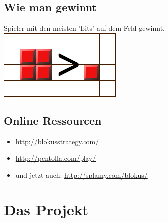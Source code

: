 \documentclass[12pt, draft]{beamer}
\begin{document}
\subsection{Wie man gewinnt}
\begin{frame}
	Spieler mit den meisten 'Bits' auf dem Feld gewinnt.
	\includegraphics[width=0.7\linewidth]{media/how2play6.png}
\end{frame}

\subsection{Online Ressourcen}
\begin{frame}
	\begin{itemize}
		\item \url{http://blokusstrategy.com/}
		\item \url{http://pentolla.com/play/}
		\item und jetzt auch: \url{http://splamy.com/blokus/}
	\end{itemize}
\end{frame}


\section{Das Projekt}
\end{document}
